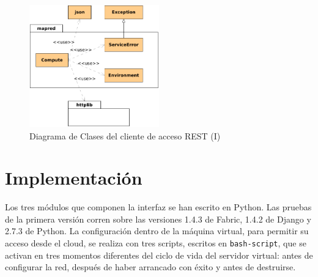 \begin{figure}[tbp]
\begin{center}
\includegraphics[width=0.5\textwidth]{imagenes/027.pdf}
 \caption{Diagrama de Clases del cliente de acceso REST (I)}
\label{fig:diagramaclasescompute1}
\end{center}
\end{figure}


\section{Implementaci\'on}\label{sec:implementacion}
\noindent Los tres m\'odulos que componen la interfaz se han escrito en Python. Las pruebas de la primera versi\'on corren sobre las versiones 1.4.3 de Fabric, 1.4.2 de Django y 2.7.3 de Python. La configuraci\'on dentro de la m\'aquina virtual, para permitir su acceso desde el cloud, se realiza con tres scripts, escritos en \texttt{bash-script}, que se activan en tres momentos diferentes del ciclo de vida del servidor virtual: antes de configurar la red, despu\'es de haber arrancado con \'exito y antes de destruirse.


